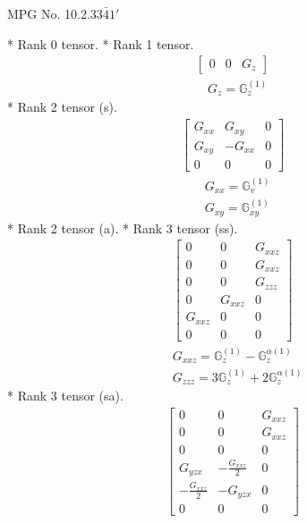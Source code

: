 \documentclass[fleqn,8pt,landscape]{jsarticle}
\begin{document}
\setcounter{MaxMatrixCols}{32}

\renewcommand{\tablename}{Table~}
\renewcommand{\figurename}{Figure~}
\begin{center}
\LARGE
MPG No. 10.2.33\quad$\bar{4}1'$
\end{center}
* Rank 0 tensor.
* Rank 1 tensor.
\begin{align*}
\begin{bmatrix} 0 & 0 & G_{z} \end{bmatrix}
\end{align*}
\begin{align*}
& G_{z} = \mathbb{G}_{z}^{(1)}
\end{align*}
* Rank 2 tensor (s).
\begin{align*}
\begin{bmatrix} G_{xx} & G_{xy} & 0 \\ G_{xy} & - G_{xx} & 0 \\ 0 & 0 & 0 \end{bmatrix}
\end{align*}
\begin{align*}
& G_{xx} = \mathbb{G}_{v}^{(1)} \\
& G_{xy} = \mathbb{G}_{xy}^{(1)}
\end{align*}
* Rank 2 tensor (a).
* Rank 3 tensor (ss).
\begin{align*}
\begin{bmatrix} 0 & 0 & G_{xxz} \\ 0 & 0 & G_{xxz} \\ 0 & 0 & G_{zzz} \\ 0 & G_{xxz} & 0 \\ G_{xxz} & 0 & 0 \\ 0 & 0 & 0 \end{bmatrix}
\end{align*}
\begin{align*}
& G_{xxz} = \mathbb{G}_{z}^{(1)} - \mathbb{G}_{z}^{\alpha(1)} \\
& G_{zzz} = 3 \mathbb{G}_{z}^{(1)} + 2 \mathbb{G}_{z}^{\alpha(1)}
\end{align*}
* Rank 3 tensor (sa).
\begin{align*}
\begin{bmatrix} 0 & 0 & G_{xxz} \\ 0 & 0 & G_{xxz} \\ 0 & 0 & 0 \\ G_{yzx} & - \frac{G_{xxz}}{2} & 0 \\ - \frac{G_{xxz}}{2} & - G_{yzx} & 0 \\ 0 & 0 & 0 \end{bmatrix}
\end{align*}
\end{document}
